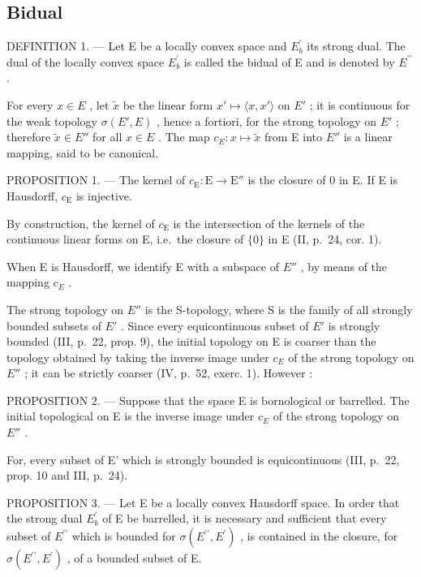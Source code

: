 \subsection{Bidual}

DEFINITION 1. --- Let E be a locally convex space and \(E_{b}^{\prime}\) its strong dual. The dual of the locally convex space \(E_{b}^{\prime}\) is called the bidual of E and is denoted by \(E^{\prime\prime}\) .

For every \(x \in E\) , let \(\tilde{x}\) be the linear form \(x' \mapsto \langle x, x' \rangle\) on \(E'\) ; it is continuous for the weak topology \(\sigma(E', E)\) , hence a fortiori, for the strong topology on \(E'\) ; therefore \(\tilde{x} \in E''\) for all \(x \in E\) . The map \(c_{E}: x \mapsto \tilde{x}\) from E into \(E''\) is a linear mapping, said to be canonical.

PROPOSITION 1. --- The kernel of \(c_{\mathrm{E}}: \mathrm{E} \to \mathrm{E}''\) is the closure of 0 in E. If E is Hausdorff, \(c_{\mathrm{E}}\) is injective.

By construction, the kernel of \(c_{\mathrm{E}}\) is the intersection of the kernels of the continuous linear forms on E, i.e.~the closure of \(\{0\}\) in E (II, p.~24, cor. 1).

When E is Hausdorff, we identify E with a subspace of \(E''\) , by means of the mapping \(c_{E}\) .

The strong topology on \(E''\) is the S-topology, where S is the family of all strongly bounded subsets of \(E'\) . Since every equicontinuous subset of \(E'\) is strongly bounded (III, p.~22, prop. 9), the initial topology on E is coarser than the topology obtained by taking the inverse image under \(c_{E}\) of the strong topology on \(E''\) ; it can be strictly coarser (IV, p.~52, exerc. 1). However :

PROPOSITION 2. --- Suppose that the space E is bornological or barrelled. The initial topological on E is the inverse image under \(c_{E}\) of the strong topology on \(E''\) .

For, every subset of E' which is strongly bounded is equicontinuous (III, p.~22, prop. 10 and III, p.~24).

PROPOSITION 3. --- Let E be a locally convex Hausdorff space. In order that the strong dual \(E_{b}^{\prime}\) of E be barrelled, it is necessary and sufficient that every subset of \(E^{\prime\prime}\) which is bounded for \(\sigma(E^{\prime\prime}, E^{\prime})\) , is contained in the closure, for \(\sigma(E^{\prime\prime}, E^{\prime})\) , of a bounded subset of E.

